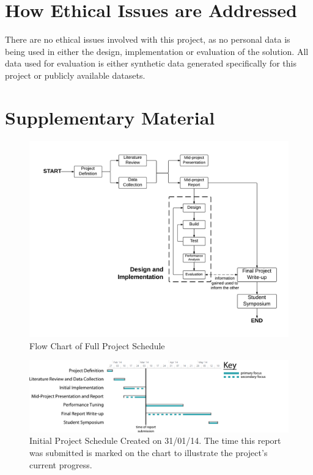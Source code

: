 \section{How Ethical Issues are Addressed}

There are no ethical issues involved with this project, as no personal data is being used in either the design, implementation or evaluation of the solution. All data used for evaluation is either synthetic data generated specifically for this project or publicly available datasets.

\section{Supplementary Material}

\begin{figure}[H]
	\centering
	\includegraphics[scale=0.6]{figures/full-project-process.pdf}
	\caption{Flow Chart of Full Project Schedule}
	\label{fig:full-project-process}
\end{figure}

\newpage

\null  %
\nointerlineskip  %
\vfill
\let\snewpage \newpage
\let\newpage \relax

\begin{figure}[H]
	\centering
	\includegraphics[scale=0.475]{figures/initial_project_schedule.pdf}
	\caption{Initial Project Schedule Created on 31/01/14. The time this report was submitted is marked on the chart to illustrate the project's current progress.}
	\label{fig:initial-schedule}
\end{figure}


